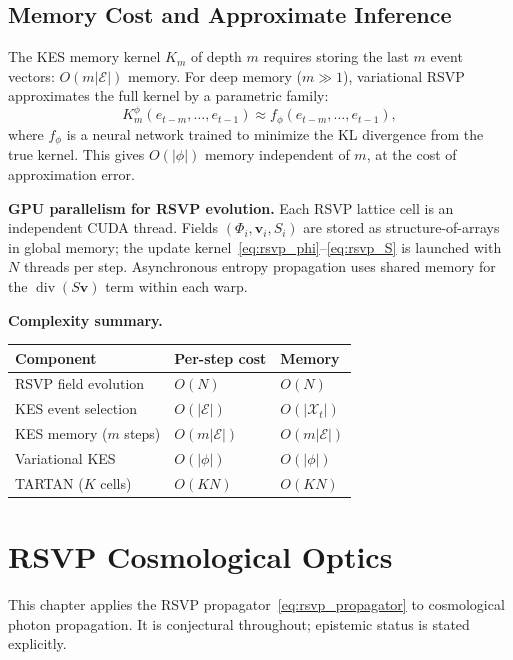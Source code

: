 \documentclass[11pt, openright, twoside]{book}
\theoremstyle{plain}
\theoremstyle{definition}
\theoremstyle{remark}
\newcommand{\vfield}{\mathbf{v}}
\newcommand{\Sfield}{S}
\begin{document}
\section{Memory Cost and Approximate Inference}

The KES memory kernel $K_m$ of depth $m$ requires storing the last $m$ event vectors:
$O(m|\mathcal{E}|)$ memory. For deep memory ($m\gg 1$), variational RSVP approximates
the full kernel by a parametric family:
\begin{equation}
  K_m^\phi(e_{t-m},\ldots,e_{t-1}) \approx f_\phi(e_{t-m},\ldots,e_{t-1}),
\end{equation}
where $f_\phi$ is a neural network trained to minimize the KL divergence from the true
kernel. This gives $O(|\phi|)$ memory independent of $m$, at the cost of approximation error.

\begin{implbox}
\textbf{GPU parallelism for RSVP evolution.} Each RSVP lattice cell is an independent
CUDA thread. Fields $(\Phi_i,\vfield_i,\Sfield_i)$ are stored as structure-of-arrays in
global memory; the update kernel~\eqref{eq:rsvp_phi}--\eqref{eq:rsvp_S} is launched with
$N$ threads per step. Asynchronous entropy propagation uses shared memory for the
$\operatorname{div}(\Sfield\vfield)$ term within each warp.

\medskip
\textbf{Complexity summary.}
\begin{center}
\begin{tabular}{@{}lll@{}}
\toprule
Component & Per-step cost & Memory \\
\midrule
RSVP field evolution & $O(N)$ & $O(N)$ \\
KES event selection & $O(|\mathcal{E}|)$ & $O(|\mathcal{X}_t|)$ \\
KES memory ($m$ steps) & $O(m|\mathcal{E}|)$ & $O(m|\mathcal{E}|)$ \\
Variational KES & $O(|\phi|)$ & $O(|\phi|)$ \\
TARTAN ($K$ cells) & $O(KN)$ & $O(KN)$ \\
\bottomrule
\end{tabular}
\end{center}
\end{implbox}

\chapter{RSVP Cosmological Optics}

\begin{depbox}
This chapter applies the RSVP propagator~\eqref{eq:rsvp_propagator} to cosmological photon
propagation. It is conjectural throughout; epistemic status is stated explicitly.
\end{depbox}
\end{document}
